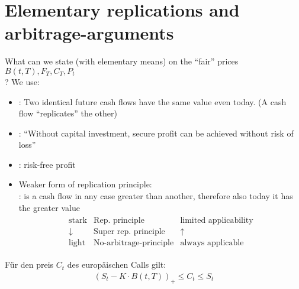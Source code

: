 \section{Elementary replications and arbitrage-arguments}
What can we state (with elementary means) on the ``fair'' prices $B(t,T), F_T, C_T, P_t $ \\?
We use: 
\begin{itemize}
	\item {}: Two identical future cash flows have the same value even today. (A cash flow ``replicates'' the other) %
	\item {}: ``Without capital investment, secure profit can be achieved without risk of loss''
	\item {}: risk-free profit\\
	\item Weaker form of replication principle:\\
	: is a cash flow in any case greater than another, therefore also today it has the greater value
	\begin{align*}
	\begin{matrix}
	\text{stark} & \text{Rep. principle} & \text{limited applicability}\\
	\downarrow & \text{Super rep. principle} & \uparrow\\
	\text{light} & \text{No-arbitrage-principle} & \text{always applicable}
	\end{matrix}
	\end{align*}
\end{itemize}
\begin{lemma} %
	Für den preis $C_t$ des europäischen Calls gilt:
	\begin{align*}
	(S_t - K\cdot B(t,T))_+ \le C_t \le S_t
	\end{align*}
\end{lemma}
